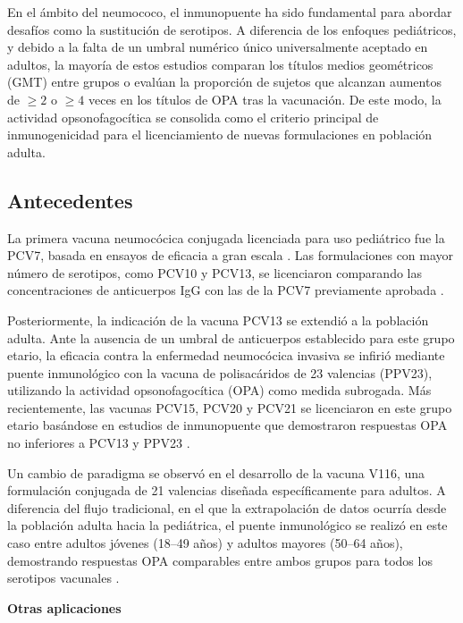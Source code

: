 En el ámbito del neumococo, el inmunopuente ha sido fundamental para abordar desafíos como la sustitución de serotipos. A diferencia de los enfoques pediátricos, y debido a la falta de un umbral numérico único universalmente aceptado en adultos, la mayoría de estos estudios comparan los títulos medios geométricos (GMT) entre grupos o evalúan la proporción de sujetos que alcanzan aumentos de $\geq2$ o $\geq4$ veces en los títulos de OPA tras la vacunación. De este modo, la actividad opsonofagocítica se consolida como el criterio principal de inmunogenicidad para el licenciamiento de nuevas formulaciones en población adulta.

\subsection{Antecedentes}

La primera vacuna neumocócica conjugada licenciada para uso pediátrico fue la PCV7, basada en ensayos de eficacia a gran escala \cite{Black2000, Klugman2003, OBrien2003, fletcher2024adult}. Las formulaciones con mayor número de serotipos, como PCV10 y PCV13, se licenciaron comparando las concentraciones de anticuerpos IgG con las de la PCV7 previamente aprobada \cite{fletcher2024adult, vesikari2009immunogenicity}.

Posteriormente, la indicación de la vacuna PCV13 se extendió a la población adulta. Ante la ausencia de un umbral de anticuerpos establecido para este grupo etario, la eficacia contra la enfermedad neumocócica invasiva se infirió mediante puente inmunológico con la vacuna de polisacáridos de 23 valencias (PPV23), utilizando la actividad opsonofagocítica (OPA) como medida subrogada. Más recientemente, las vacunas PCV15, PCV20 y PCV21 se licenciaron en este grupo etario basándose en estudios de inmunopuente que demostraron respuestas OPA no inferiores a PCV13 y PPV23 \cite{fletcher2024adult, mcelwee2026overview, ganaie2025approaches} .

Un cambio de paradigma se observó en el desarrollo de la vacuna 
V116, una formulación conjugada de 21 valencias diseñada específicamente 
para adultos. A diferencia del flujo tradicional, en el que la extrapolación 
de datos ocurría desde la población adulta hacia la pediátrica, el puente 
inmunológico se realizó en este caso entre adultos jóvenes (18--49 años) 
y adultos mayores (50--64 años), demostrando respuestas OPA comparables 
entre ambos grupos para todos los serotipos vacunales \cite{platt2024safety}.

\vspace{\baselineskip}
\textbf{Otras aplicaciones}
\vspace{\baselineskip}


